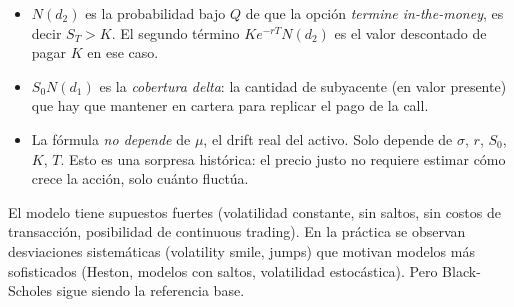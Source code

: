 \documentclass[11pt, a4paper]{article}
\begin{document}
\begin{itemize}
    \item $N(d_2)$ es la probabilidad bajo $Q$ de que la opción \emph{termine in-the-money}, es
    decir $S_T > K$. El segundo término $K e^{-rT} N(d_2)$ es el valor descontado de pagar $K$
    en ese caso.
    \item $S_0 N(d_1)$ es la \emph{cobertura delta}: la cantidad de subyacente (en valor presente)
    que hay que mantener en cartera para replicar el pago de la call.
    \item La fórmula \emph{no depende} de $\mu$, el drift real del activo. Solo depende de
    $\sigma$, $r$, $S_0$, $K$, $T$. Esto es una sorpresa histórica: el precio justo no requiere
    estimar cómo crece la acción, solo cuánto fluctúa.
\end{itemize}

\obs El modelo tiene supuestos fuertes (volatilidad constante, sin saltos, sin costos de
transacción, posibilidad de continuous trading). En la práctica se observan desviaciones
sistemáticas (volatility smile, jumps) que motivan modelos más sofisticados (Heston, modelos con
saltos, volatilidad estocástica). Pero Black-Scholes sigue siendo la referencia base.
\end{document}
